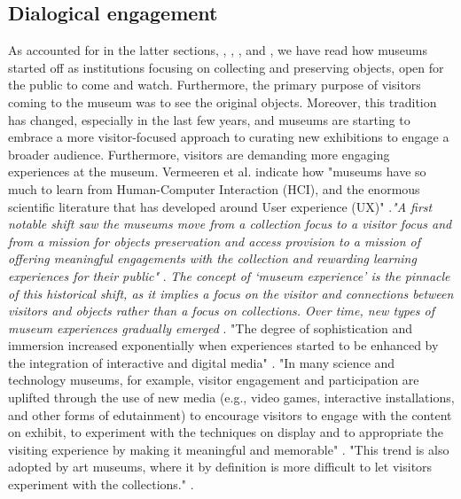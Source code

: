 \subsection{Dialogical engagement}
As accounted for in the latter sections, \autocite{vergo_museology_1989}, \autocite{Thi_book}, \autocite{Miekebal_book}, and \autocite{light_design_2017}, we have read how museums started off as institutions focusing on collecting and preserving objects, open for the public to come and watch. Furthermore, the primary purpose of visitors coming to the museum was to see the original objects. Moreover, this tradition has changed, especially in the last few years, and museums are starting to embrace a more visitor-focused approach to curating new exhibitions to engage a broader audience. Furthermore, visitors are demanding more engaging experiences at the museum. Vermeeren et al. indicate how "museums have so much to learn from Human-Computer Interaction (HCI), and the enormous scientific literature that has developed around User experience (UX)" \autocite{vermeeren_museum_2018}.\emph{"A first notable shift saw the museums move from a collection focus to a visitor focus and from a mission for objects preservation and access provision to a mission of offering meaningful engagements with the collection and rewarding learning experiences for their public"} \autocite[p. 3]{vermeeren_museum_2018}. \emph{The concept of ‘museum experience’ is the pinnacle of this historical shift, as it implies a focus on the visitor and connections between visitors and objects rather than a focus on collections. Over time, new types of museum experiences gradually emerged} \autocite[p. 3]{vermeeren_museum_2018}. "The degree of sophistication and immersion increased exponentially when experiences started to be enhanced by the integration of interactive and digital media" \autocite[p. 3]{vermeeren_museum_2018}. "In many science and technology museums, for example, visitor engagement and participation are uplifted through the use of new media (e.g., video games, interactive installations, and other forms of edutainment) to encourage visitors to engage with the content on exhibit, to experiment with the techniques on display and to appropriate the visiting experience by making it meaningful and memorable" \autocite[p. 3]{vermeeren_museum_2018}. "This trend is also adopted by art museums, where it by definition is more difficult to let visitors experiment with the collections." \autocite[p. 3]{vermeeren_museum_2018}.


